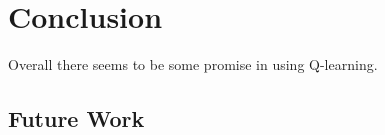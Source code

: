 \documentclass[12pt, final]{dalcsthesis}
\begin{document}
\chapter{Conclusion}

Overall there seems to be some promise in using Q-learning.

\section{Future Work}



\end{document}
